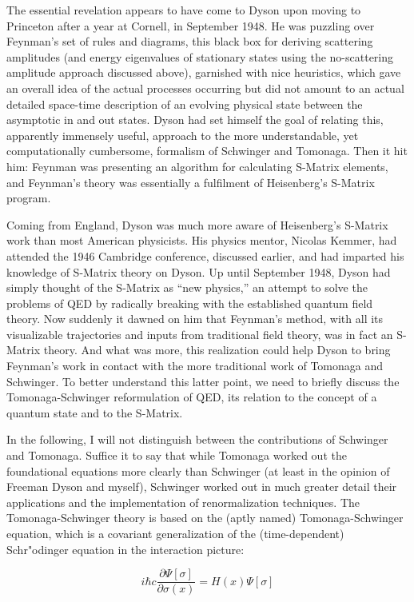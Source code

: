 \documentclass[12pt,a4paper]{article}
\begin{document}
The essential revelation appears to have come to Dyson upon moving to Princeton after a year at Cornell, in September 1948. He was puzzling over Feynman's set of rules and diagrams, this black box for deriving scattering amplitudes (and energy eigenvalues of stationary states using the no-scattering amplitude approach discussed above), garnished with nice heuristics, which gave an overall idea of the actual processes occurring but did not amount to an actual detailed space-time description of an evolving physical state between the asymptotic in and out states. Dyson had set himself the goal of relating this, apparently immensely useful, approach to the more understandable, yet computationally cumbersome, formalism of Schwinger and Tomonaga. Then it hit him: Feynman was presenting an algorithm for calculating S-Matrix elements, and Feynman's theory was essentially a fulfilment of Heisenberg's S-Matrix program.

Coming from England, Dyson was much more aware of Heisenberg's S-Matrix work than most American physicists. His physics mentor, Nicolas Kemmer, had attended the 1946 Cambridge conference, discussed earlier, and had imparted his knowledge of S-Matrix theory on Dyson. Up until September 1948, Dyson had simply thought of the S-Matrix as ``new physics,'' an attempt to solve the problems of QED by radically breaking with the established quantum field theory. Now suddenly it dawned on him that Feynman's method, with all its visualizable trajectories and inputs from traditional field theory, was in fact an S-Matrix theory. And what was more, this realization could help Dyson to bring Feynman's work in contact with the more traditional work of Tomonaga and Schwinger. To better understand this latter point, we need to briefly discuss the Tomonaga-Schwinger reformulation of QED, its relation to the concept of a quantum state and to the S-Matrix.

In the following, I will not distinguish between the contributions of Schwinger and Tomonaga. Suffice it to say that while Tomonaga worked out the foundational equations more clearly than Schwinger (at least in the opinion of Freeman Dyson and myself), Schwinger worked out in much greater detail their applications and the implementation of renormalization techniques. The Tomonaga-Schwinger theory is based on the (aptly named) Tomonaga-Schwinger equation, which is a covariant generalization of the (time-dependent) Schr"odinger equation in the interaction picture:

\begin{equation}
i \hbar c \frac{\partial \Psi [\sigma]}{\partial \sigma (x)} = H (x) \Psi [\sigma]
\end{equation}
\end{document}
